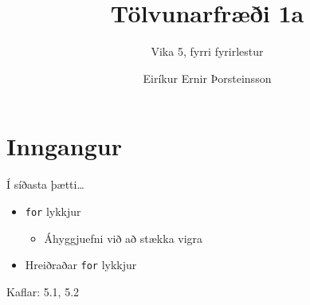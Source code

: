 \documentclass{beamer}
\author{Eiríkur Ernir Þorsteinsson}
\title{Tölvunarfræði 1a}
\subtitle{Vika 5, fyrri fyrirlestur}
\begin{document}
\begin{frame}
\titlepage
\end{frame}

\section{Inngangur}

\begin{frame}{Í síðasta þætti\ldots}
\begin{itemize}
 \item \texttt{for} lykkjur
 \begin{itemize}
  \item Áhyggjuefni við að stækka vigra
 \end{itemize}
 \item Hreiðraðar \texttt{for} lykkjur
\end{itemize}
Kaflar: 5.1, 5.2
\end{frame}
\end{document}
